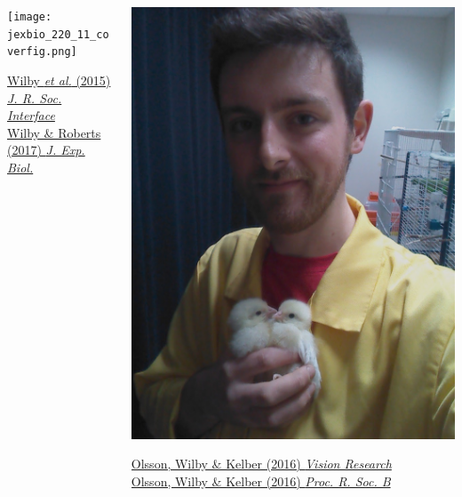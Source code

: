 \documentclass{beamer} %
\begin{document}
  \begin{frame}
    \begin{columns}
      \begin{column}{0.5\textwidth}
        \begin{center}
          \texttt{[image: jexbio\_220\_11\_coverfig.png]}
        \end{center}
        \tiny
        \href{http://dx.doi.org/10.1098/rsif.2015.0591}{Wilby \textit{et al.} (2015) \textit{J. R. Soc. Interface}}\\
        \href{https://doi.org/10.1242/jeb.152918}{Wilby \& Roberts (2017) \textit{J. Exp. Biol.}}
      \end{column}
      \begin{column}{0.5\textwidth}
        \begin{center}
          \includegraphics[height=0.8\textheight]{IMG_20150414_152004.jpg}
        \end{center}
        \tiny
        \href{https://doi.org/10.1016/j.visres.2016.10.009}{Olsson, Wilby \& Kelber (2016) \textit{Vision Research}}\\
        \href{http://dx.doi.org/10.1098/rspb.2016.0411}{Olsson, Wilby \& Kelber (2016) \textit{Proc. R. Soc. B}}
      \end{column}
    \end{columns}
  \end{frame}
\end{document}

